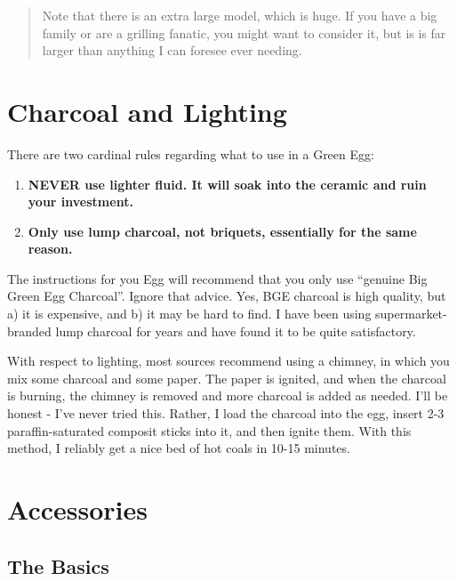 \documentclass[
]{book}
\providecommand{\tightlist}{%
  \setlength{\itemsep}{0pt}\setlength{\parskip}{0pt}}
\begin{document}
\begin{quote}
Note that there is an extra large model, which is huge. If you have a big family or are a grilling fanatic, you might want to consider it, but is is far larger than anything I can foresee ever needing.
\end{quote}

\hypertarget{charcoal-and-lighting}{%
\section{Charcoal and Lighting}\label{charcoal-and-lighting}}

There are two cardinal rules regarding what to use in a Green Egg:

\begin{enumerate}
\def\labelenumi{\arabic{enumi}.}
\tightlist
\item
  \textbf{NEVER use lighter fluid. It will soak into the ceramic and ruin your investment.}
\item
  \textbf{Only use lump charcoal, not briquets, essentially for the same reason.}
\end{enumerate}

The instructions for you Egg will recommend that you only use ``genuine Big Green Egg Charcoal''. Ignore that advice. Yes, BGE charcoal is high quality, but a) it is expensive, and b) it may be hard to find. I have been using supermarket-branded lump charcoal for years and have found it to be quite satisfactory.

With respect to lighting, most sources recommend using a chimney, in which you mix some charcoal and some paper. The paper is ignited, and when the charcoal is burning, the chimney is removed and more charcoal is added as needed. I'll be honest - I've never tried this. Rather, I load the charcoal into the egg, insert 2-3 paraffin-saturated composit sticks into it, and then ignite them. With this method, I reliably get a nice bed of hot coals in 10-15 minutes.

\hypertarget{accessories}{%
\section{Accessories}\label{accessories}}

\hypertarget{the-basics}{%
\subsection{The Basics}\label{the-basics}}
\end{document}
